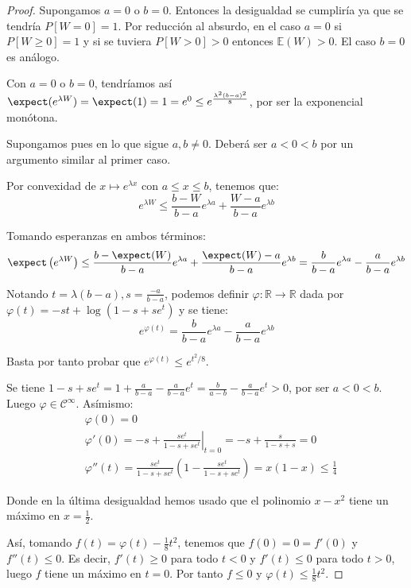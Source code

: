\begin{proof}
 Supongamos $a=0$ o $b=0$. Entonces la desigualdad se cumpliría ya que se tendría $P[W=0]=1$. Por
 reducción al absurdo, en el caso $a=0$ si $P[W\ge 0] = 1$ y si se tuviera $P[W>0] > 0$ entonces $\mathbb{E}(W) > 0$.
 El caso $b=0$ es análogo.
 
 Con $a=0$ o $b=0$, tendríamos así $\expect(e^{\lambda W}) = \expect(1) = 1 = e^0 \le e^{\frac{\lambda^2 (b-a)^2}{8}}$, 
 por ser la exponencial monótona. 
 
 Supongamos pues en lo que sigue $a, b\neq 0$. Deberá ser $a < 0 < b$ por un argumento similar al
 primer caso.
 
 Por convexidad de $x\mapsto e^{\lambda x}$ con $a\le x \le b$, tenemos que:
 \[
   e^{\lambda W} \le \frac{b-W}{b-a} e^{\lambda a} + \frac{W-a}{b-a}e^{\lambda b}
 \]

 Tomando esperanzas en ambos términos: 
 \[
   \expect \left(e^{\lambda W}\right) \le \frac{b-\expect(W)}{b-a} e^{\lambda a} + 
   \frac{\expect(W)-a}{b-a}e^{\lambda b} = \frac{b}{b-a} e^{\lambda a} - \frac{a}{b-a} e^{\lambda b}
 \]
 
 Notando $t = \lambda(b-a), s = \frac{-a}{b-a}$, podemos definir $\varphi : \mathbb{R} \rightarrow \mathbb{R}$
 dada por $\varphi(t) = -st + \log(1-s+se^t)$ y se tiene:
 \[
   e^{\varphi(t)} = \frac{b}{b-a} e^{\lambda a} - \frac{a}{b-a} e^{\lambda b}
 \]
 
 Basta por tanto probar que $e^{\varphi(t)} \le e^{t^2/8}$.
 
 Se tiene $1-s+se^t = 1 + \frac{a}{b-a} - \frac{a}{b-a} e^t = \frac{b}{a-b} - \frac{a}{b-a} e^t > 0$, por
 ser $a< 0 < b$. Luego $\varphi\in \mathcal{C}^{\infty}$. Asímismo:
 \begin{align*}
  &\varphi(0) = 0 \\  
  & \varphi'(0) = \left.-s + \frac{se^t}{1-s+se^t} \right|_{t=0} = -s + \frac{s}{1-s+s} = 0\\
  & \varphi''(t) = \frac{se^t}{1-s+se^t} \left(1-\frac{se^t}{1-s+se^t}\right) = x(1-x) \le \frac{1}{4}
 \end{align*}
 
 Donde en la última desigualdad hemos usado que el polinomio $x-x^2$ tiene un máximo en $x=\frac{1}{2}$.
 
 Así, tomando $f(t) = \varphi(t) - \frac{1}{8}t^2$, tenemos que $f(0) = 0 = f'(0)$ y $f''(t) \le 0$. Es decir, 
 $f'(t) \ge 0$ para todo $t<0$ y $f'(t) \le 0$ para todo $t > 0$, luego $f$ tiene un máximo en $t=0$. Por tanto
 $f \le 0$ y $\varphi(t) \le \frac{1}{8} t^2$.
 \end{proof}


